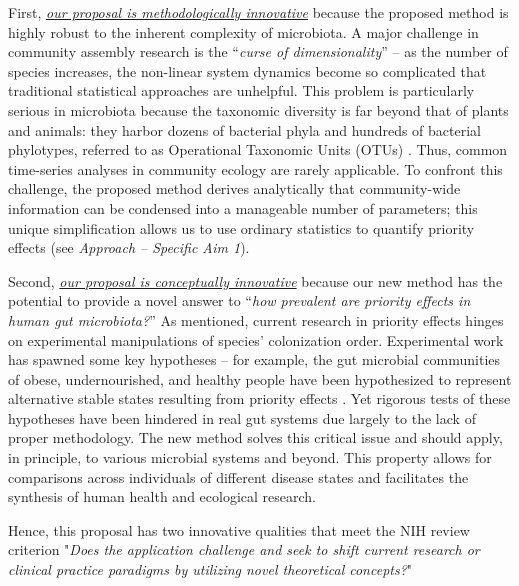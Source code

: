 \documentclass[12pt, class=article, crop=false]{standalone}
\begin{document}
First, \ul{\emph{our proposal is methodologically innovative}} because the proposed method is highly robust to the inherent complexity of microbiota.
A major challenge in community assembly research is the ``\textit{curse of dimensionality}'' -- as the number of species increases, the non-linear system dynamics become so complicated that traditional statistical approaches are unhelpful.
This problem is particularly serious in microbiota because the taxonomic diversity is far beyond that of plants and animals: they harbor dozens of bacterial phyla and hundreds of bacterial phylotypes, referred to as Operational Taxonomic Units (OTUs) \citep{fierer_animalcules_2012}.
Thus, common time-series analyses in community ecology are rarely applicable.
To confront this challenge, the proposed method derives analytically that community-wide information can be condensed into a manageable number of parameters; this unique simplification allows us to use ordinary statistics to quantify priority effects (see \textit{Approach -- Specific Aim 1}).

Second, \ul{\emph{our proposal is conceptually innovative}} because our new method has the potential to provide a novel answer to ``\textit{how prevalent are priority effects in human gut microbiota?}''
As mentioned, current research in priority effects hinges on experimental manipulations of species' colonization order.
Experimental work has spawned some key hypotheses -- for example, the gut microbial communities of obese, undernourished, and healthy people have been hypothesized to represent alternative stable states resulting from priority effects \citep{fierer_animalcules_2012}.
Yet rigorous tests of these hypotheses have been hindered in real gut systems due largely to the lack of proper methodology. 
The new method solves this critical issue and should apply, in principle, to various microbial systems and beyond.
This property allows for comparisons across individuals of different disease states and facilitates the synthesis of human health and ecological research.

Hence, this proposal has two innovative qualities that meet the NIH review criterion "\emph{Does the application challenge and seek to shift current research or clinical practice paradigms by utilizing novel theoretical concepts?}"
\end{document}
